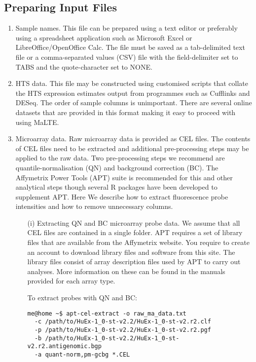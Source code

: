 \documentclass[a4paper,12pt]{article}
\begin{document}
\subsection{Preparing Input Files}
\label{gep:prepare}
\begin{enumerate}
\item Sample names. This file can be prepared using a text editor or preferably using a spreadsheet application such as Microsoft Excel or LibreOffice/OpenOffice Calc. The file must be saved as a tab-delimited text file or a comma-separated values (CSV) file with the field-delimiter set to TABS and the quote-character set to NONE.

\item HTS data. This file may be constructed using customised scripts that collate the HTS expression estimates output from programmes such as Cufflinks and DESeq. The order of sample columns is unimportant. There are several online datasets that are provided in this format making it easy to proceed with using MaLTE.

\item Microarray data. Raw microarray data is provided as CEL files. The contents of CEL files need to be extracted and additional pre-processing steps may be applied to the raw data. Two pre-processing steps we recommend are quantile-normalisation (QN) and background correction (BC). The Affymetrix Power Tools (APT) suite is recommended for this and other analytical steps though several R packages have been developed to supplement APT.  Here We describe how to extract fluorescence probe intensities and how to remove unnecessary columns.

\begin{enumerate}
\item[(i)] Extracting QN and BC microarray probe data. We assume that all CEL files are contained in a single folder. APT requires a set of library files that are available from the Affymetrix website. You require to create an account to download library files and software from this site. The library files consist of array description files used by APT to carry out analyses. More information on these can be found in the manuals provided for each array type. 

To extract probes with QN and BC:
\begin{verbatim}
me@home ~$ apt-cel-extract -o raw_ma_data.txt 
  -c /path/to/HuEx-1_0-st-v2.2/HuEx-1_0-st-v2.r2.clf 
  -p /path/to/HuEx-1_0-st-v2.2/HuEx-1_0-st-v2.r2.pgf 
  -b /path/to/HuEx-1_0-st-v2.2/HuEx-1_0-st-v2.r2.antigenomic.bgp 
  -a quant-norm,pm-gcbg *.CEL
\end{verbatim}


\end{enumerate}
\end{enumerate}
\end{document}
